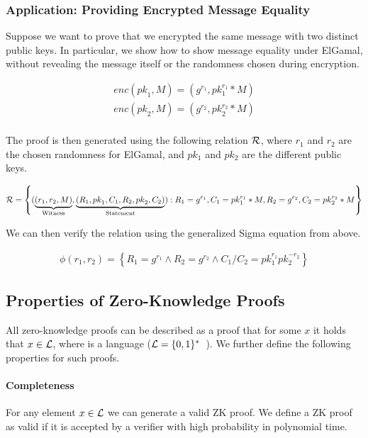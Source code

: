 \subsubsection{Application: Providing Encrypted Message Equality}
Suppose we want to prove that we encrypted the same message with two distinct public keys.
In particular, we show how to show message equality under ElGamal, without revealing the message itself or the randomness chosen during encryption.

\begin{align*}
{enc}({pk}_1, M) = (g^{r_1}, pk_1^{r_1} *M) \\
{enc}({pk}_2, M) = (g^{r_2}, {pk}_2^{r_2} * M) \\
\end{align*}

The proof is then generated using the following relation ${\cal R}$, where $r_1$ and $r_2$ are the chosen randomness for ElGamal, and $pk_1$ and $pk_2$ are the different public keys.

\begin{align*}
    {\cal R} = \left\{ ( \underbrace{(r_1, r_2, M)}_{\text{Witness}}, \underbrace{(R_1, {pk}_1, C_1, R_2, {pk}_2, C_2)}_{\text{Statement}} ) : R_1 = g^{r_1}, C_1 = {pk}_1^{r_1} *M, R_2 = g^{r_2}, C_2 = {pk}_2^{r_2} * M \right\}
\end{align*}

We can then verify the relation using the generalized Sigma equation from above.

\begin{align*}
    \phi(r_1, r_2) = \left\{ R_1 = g^{r_1} \land R_2 = g^{r_2} \land C_1 / C_2 = pk_1^{r_1} pk_2^{-r_2} \right\}
\end{align*}

\subsection{Properties of Zero-Knowledge Proofs}
All zero-knowledge proofs can be described as a proof that for some $x$ it holds that $x \in {\cal L}$, where is a language (${\cal L} = \{0,1\}^{*}$~\cite{goldwasser1989knowledge}).
We further define the following properties for such proofs.

\paragraph{Completeness} For any element $x \in {\cal L}$ we can generate a valid ZK proof.
We define a ZK proof as valid if it is accepted by a verifier with high probability in polynomial time.

